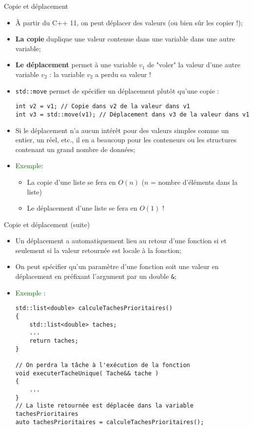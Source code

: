 \documentclass[compress,10pt,aspectratio=169]{beamer}
\begin{document}
\begin{frame}[fragile]{Copie et déplacement}
\scriptsize

\begin{itemize}
\item À partir du C++ 11, on peut déplacer des valeurs (ou bien sûr les copier !);
\item \textbf{La copie} duplique une valeur contenue dans une variable dans une autre variable;
\item \textbf{Le déplacement} permet à une variable $v_{1}$ de "voler" la valeur d'une autre variable $v_{2}$ : la variable 
$v_{2}$ a perdu sa valeur !
\item \texttt{std::move} permet de spécifier un déplacement plutôt qu'une copie :
\begin{verbatim}
int v2 = v1; // Copie dans v2 de la valeur dans v1 
int v3 = std::move(v1); // Déplacement dans v3 de la valeur dans v1 
\end{verbatim}
\item Si le déplacement n'a aucun intérêt pour des valeurs simples comme un entier, un réel, etc., il en a beaucoup pour 
les conteneurs ou les structures contenant un grand nombre de données;
\item \textcolor{DarkGreen}{Exemple}:
\begin{itemize}
\scriptsize
\item La copie d'une liste se fera en $O(n)$ ($n$ = nombre d'éléments dans la liste)
\item Le déplacement d'une liste se fera en $O(1)$ !
\end{itemize}
\end{itemize}
\end{frame}

\begin{frame}[fragile]{Copie et déplacement (suite)}
    \scriptsize

\begin{itemize}
\item Un déplacement a automatiquement lieu au retour d'une fonction si et seulement si la valeur retournée est locale à la fonction;
\item On peut spécifier qu'un paramètre d'une fonction soit une valeur en déplacement en préfixant l'argument par un double \texttt{\&};
\item \textcolor{DarkGreen}{Exemple} :
\begin{verbatim}
std::list<double> calculeTachesPrioritaires()
{
    std::list<double> taches;
    ... 
    return taches;
}

// On perdra la tâche à l'exécution de la fonction
void executerTacheUnique( Tache&& tache )
{
    ...
}
// La liste retournée est déplacée dans la variable tachesPrioritaires
auto tachesPrioritaires = calculeTachesPrioritaires();
\end{verbatim}
\end{itemize}
\end{frame}
\end{document}
